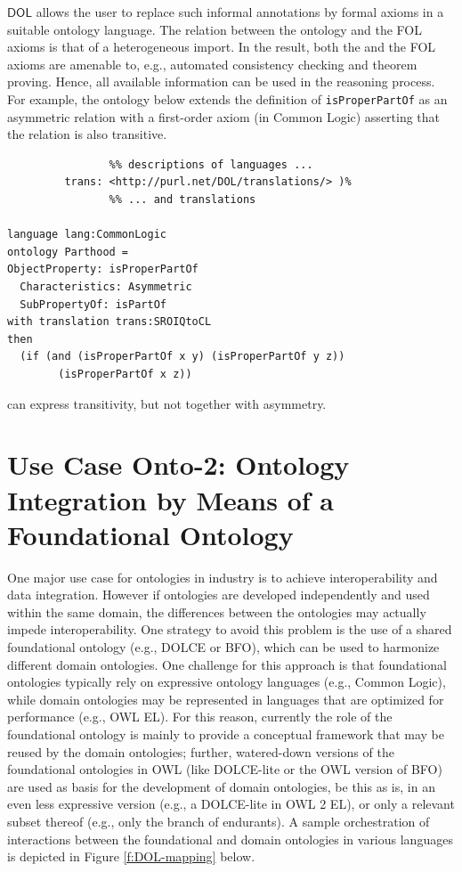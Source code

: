 \documentclass[10pt,fleqn,final]{scrreprt}
\newcommand*{\DOL}{\ensuremath{\mathsf{DOL}}\xspace}
\newenvironment{definitions}[0]{\medskip }{}
\begin{document}
\begin{definitions}
\DOL allows the user to replace such informal annotations by formal axioms in a suitable ontology 
language. The relation between the \OWL ontology and the FOL axioms is that of a heterogeneous 
import. In the result, both the \OWL and the FOL axioms are amenable to, e.g., automated consistency 
checking and theorem proving. Hence, all available information can be used in the reasoning process.
For example, the ontology below extends the \OWL definition of \texttt{isProperPartOf} as an asymmetric relation
with a first-order axiom (in Common Logic) asserting that the relation is also transitive.
\begin{lstlisting}[basicstyle=\small\ttfamily,language=dolText,morekeywords={logic,ontology,props,ObjectProperty,Class,DisjointUnionOf,SubClassOf,Characteristics,Transitive,Asymmetric,SubPropertyOf,DisjointClasses,EquivalentTo,inverse,only,forall,iff,if,or,exists},escapechar=@,mathescape]
%prefix( lang:  <http://purl.net/DOL/languages/>
                %% descriptions of languages ...
         trans: <http://purl.net/DOL/translations/> )%
                %% ... and translations

language lang:CommonLogic
ontology Parthood =
ObjectProperty: isProperPartOf  
  Characteristics: Asymmetric  
  SubPropertyOf: isPartOf 
with translation trans:SROIQtoCL
then
  (if (and (isProperPartOf x y) (isProperPartOf y z)) 
        (isProperPartOf x z))
\end{lstlisting}
\OWL can express transitivity, but not together with asymmetry.

\section{Use Case Onto-2: Ontology Integration by Means of a Foundational Ontology}
One major use case for ontologies in industry is to achieve interoperability and data integration. 
However if ontologies are developed independently and used  within the same domain, the 
differences between the ontologies may actually impede interoperability. One strategy to avoid this 
problem is the use of a shared  foundational ontology (e.g., DOLCE or BFO), which can be used to 
harmonize different domain ontologies. One challenge for this approach is that foundational 
ontologies typically rely on expressive ontology languages (e.g., Common Logic), while domain 
ontologies may be represented in languages that are optimized for performance (e.g., OWL EL). For 
this reason, currently the role of the foundational ontology is mainly to provide a conceptual 
framework that may be reused by the  domain ontologies; further, watered-down versions of the 
foundational ontologies in OWL (like DOLCE-lite or the OWL version of BFO) are used as basis for 
the  development of domain ontologies, be this as is, in an even less expressive version (e.g., a 
DOLCE-lite in OWL 2 EL), or only a relevant subset thereof (e.g., only the branch of endurants). A 
sample orchestration of interactions between the foundational and domain ontologies in various 
languages is depicted in Figure \ref{f:DOL-mapping} below.


\end{definitions}
\end{document}
